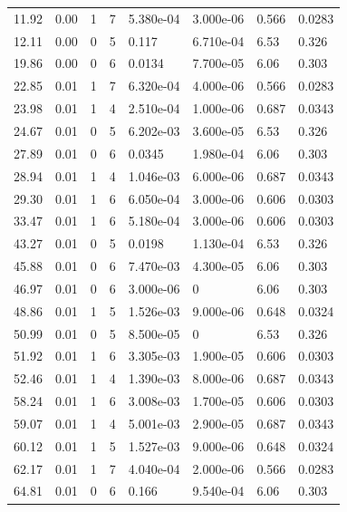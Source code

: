 \documentclass[preview]{standalone}
\begin{document}
{{\begin{tabular}{L{1.2cm}C{1.2cm} C{0.3cm}C{0.5cm} C{1.4cm}C{1.4cm} C{1.4cm}C{1.4cm}}
  11.92  &  0.00  & 1     &  7 &  5.380e-04  & 3.000e-06  & 0.566 &  0.0283   \\ 
  12.11  &  0.00  & 0     &  5 &  0.117  & 6.710e-04  & 6.53 &  0.326   \\ 
  19.86  &  0.00  & 0     &  6 &  0.0134  & 7.700e-05  & 6.06 &  0.303   \\ 
  22.85  &  0.01  & 1     &  7 &  6.320e-04  & 4.000e-06  & 0.566 &  0.0283   \\ 
  23.98  &  0.01  & 1     &  4 &  2.510e-04  & 1.000e-06  & 0.687 &  0.0343   \\ 
  24.67  &  0.01  & 0     &  5 &  6.202e-03  & 3.600e-05  & 6.53 &  0.326   \\ 
  27.89  &  0.01  & 0     &  6 &  0.0345  & 1.980e-04  & 6.06 &  0.303   \\ 
  28.94  &  0.01  & 1     &  4 &  1.046e-03  & 6.000e-06  & 0.687 &  0.0343   \\ 
  29.30  &  0.01  & 1     &  6 &  6.050e-04  & 3.000e-06  & 0.606 &  0.0303   \\ 
  33.47  &  0.01  & 1     &  6 &  5.180e-04  & 3.000e-06  & 0.606 &  0.0303   \\ 
  43.27  &  0.01  & 0     &  5 &  0.0198  & 1.130e-04  & 6.53 &  0.326   \\ 
  45.88  &  0.01  & 0     &  6 &  7.470e-03  & 4.300e-05  & 6.06 &  0.303   \\ 
  46.97  &  0.01  & 0     &  6 &  3.000e-06  & 0  & 6.06 &  0.303   \\ 
  48.86  &  0.01  & 1     &  5 &  1.526e-03  & 9.000e-06  & 0.648 &  0.0324   \\ 
  50.99  &  0.01  & 0     &  5 &  8.500e-05  & 0  & 6.53 &  0.326   \\ 
  51.92  &  0.01  & 1     &  6 &  3.305e-03  & 1.900e-05  & 0.606 &  0.0303   \\ 
  52.46  &  0.01  & 1     &  4 &  1.390e-03  & 8.000e-06  & 0.687 &  0.0343   \\ 
  58.24  &  0.01  & 1     &  6 &  3.008e-03  & 1.700e-05  & 0.606 &  0.0303   \\ 
  59.07  &  0.01  & 1     &  4 &  5.001e-03  & 2.900e-05  & 0.687 &  0.0343   \\ 
  60.12  &  0.01  & 1     &  5 &  1.527e-03  & 9.000e-06  & 0.648 &  0.0324   \\ 
  62.17  &  0.01  & 1     &  7 &  4.040e-04  & 2.000e-06  & 0.566 &  0.0283   \\ 
  64.81  &  0.01  & 0     &  6 &  0.166  & 9.540e-04  & 6.06 &  0.303   \\ 

\end{tabular}}}
\end{document}
